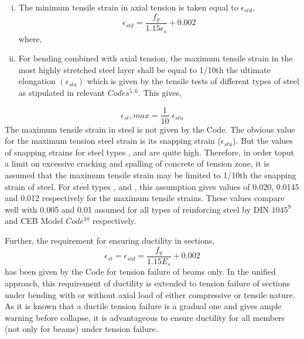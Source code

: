 \begin{enumerate}[(i)]
\item The minimum tensile strain in axial tension is taken equal to
$\epsilon_{std}$,
\begin{equation}
\epsilon_{std}=\frac{f_y}{1.15{\epsilon_s}}+0.002
\label{minimumtensilestrain}
\end{equation}
where, 
\item  For bending combined with axial tension, the maximum tensile
strain in the most highly stretched steel layer shall be equal to 1/10th
the ultimate elongation $(\epsilon_{stu})$ which is given by the tensile
tests of different types of steel as stipulated in relevant
$Codes^{5,6}$. This gives,
\end{enumerate}
\begin{equation}
\epsilon_{st},max=\frac{1}{10}.\epsilon_{stu}
\end{equation}
The maximum tensile strain in steel is not given by the Code. The obvious
value for the maximum tension steel strain is its snapping strain
($\epsilon_{stu}$). But the values of snapping strains for steel types
{\fetwofivezero}, {\fefouronefive} and {\fefivezerozero} are quite high.
Therefore, in order toput a limit on excessive cracking and spalling of
concrete of tension zone, it is assumed that the maximum tensile strain
may be limited to 1/10th the snapping strain of steel. For steel types
{\fetwofivezero}, {\fefouronefive} and {\fefivezerozero}, this assumption
gives values of 0.020, 0.0145 and 0.012 respectively for the maximum
tensile strains. These values compare well with 0.005 and 0.01 assumed for 
all types of reinforcing steel by DIN $1045^9$ and CEB Model $Code^{10}$
respectively.

Further, the requirement for ensuring ductility in sections,
$$\epsilon_{st}=\epsilon_{std}=\frac{f_y}{1.15 E_s}+0.002$$
has been given by the Code for tension failure of beams only. In the
unified approach, this requirement of ductility is extended to tension
failure of sections under bending with or without axial load of either
compressive or tensile nature. As it is known that a ductile tension
failure is a gradual one and gives ample warning before collapse, it
is advantageous to ensure ductility for all members (not only for beams) 
under tension failure.

